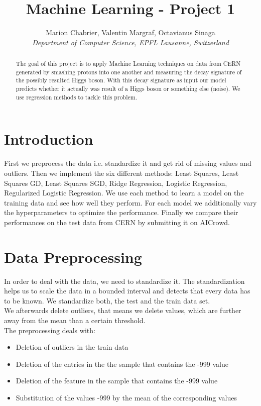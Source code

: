 \documentclass[10pt,conference,compsocconf]{IEEEtran}
\begin{document}
\title{Machine Learning - Project 1}

\author{
  Marion Chabrier, Valentin Margraf, Octavianus Sinaga\\
  \textit{Department of Computer Science, EPFL Lausanne, Switzerland}
}

\maketitle

\begin{abstract}
The goal of this project is to apply Machine Learning techniques on data from CERN generated by smashing protons into one another and measuring the decay signature of the possibly resulted Higgs boson. With this decay signature as input our model predicts whether it actually was result of a Higgs boson or something else (noise). We use regression methods to tackle this problem.
\end{abstract}

\section{Introduction}
First we preprocess the data i.e. standardize it and get rid of missing values and outliers.
Then we implement the six different methods: Least Squares, Least Squares GD, Least Squares SGD, Ridge Regression, Logistic Regression, Regularized Logistic Regression. We use each method to learn a model on the training data and see how well they perform. For each model we additionally vary the hyperparameters to optimize the performance. Finally we compare their performances on the test data from CERN by submitting it on AICrowd.



\section{Data Preprocessing}
\label{sec:prepro}
In order to deal with the data, we need to standardize it. The standardization helps us to scale the data in a bounded interval and detects that every data has to be known. We standardize both, the test and the train data set. \\
We afterwards delete outliers, that means we delete values, which are further away from the mean than a certain threshold. 
\\
The preprocessing deals with:
\begin{itemize}
	\item Deletion of outliers in the train data
	\item Deletion of the entries in the the sample that contains the -999 value
	\item Deletion of the feature in the sample that contains the -999 value
	\item Substitution of the values -999 by the mean of the corresponding values
\end{itemize}
\end{document}
